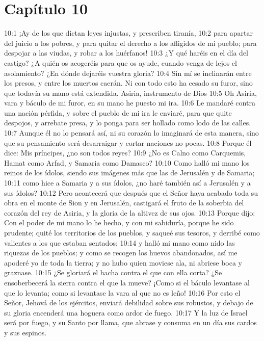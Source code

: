 \section*{Capítulo 10 }
 
10:1 ¡Ay de los que dictan leyes injustas, y prescriben tiranía, 
10:2 para apartar del juicio a los pobres, y para quitar el derecho a los afligidos de mi pueblo; para despojar a las viudas, y robar a los huérfanos! 
10:3 ¿Y qué haréis en el día del castigo? ¿A quién os acogeréis para que os ayude, cuando venga de lejos el asolamiento? ¿En dónde dejaréis vuestra gloria? 
10:4 Sin mí se inclinarán entre los presos, y entre los muertos caerán. Ni con todo esto ha cesado su furor, sino que todavía su mano está extendida. 
Asiria, instrumento de Dios 
10:5 Oh Asiria, vara y báculo de mi furor, en su mano he puesto mi ira. 
10:6 Le mandaré contra una nación pérfida, y sobre el pueblo de mi ira le enviaré, para que quite despojos, y arrebate presa, y lo ponga para ser hollado como lodo de las calles. 
10:7 Aunque él no lo pensará así, ni su corazón lo imaginará de esta manera, sino que su pensamiento será desarraigar y cortar naciones no pocas. 
10:8 Porque él dice: Mis príncipes, ¿no son todos reyes? 
10:9 ¿No es Calno como Carquemis, Hamat como Arfad, y Samaria como Damasco? 
10:10 Como halló mi mano los reinos de los ídolos, siendo sus imágenes más que las de Jerusalén y de Samaria; 
10:11 como hice a Samaria y a sus ídolos, ¿no haré también así a Jerusalén y a sus ídolos? 
10:12 Pero acontecerá que después que el Señor haya acabado toda su obra en el monte de Sion y en Jerusalén, castigará el fruto de la soberbia del corazón del rey de Asiria, y la gloria de la altivez de sus ojos. 
10:13 Porque dijo: Con el poder de mi mano lo he hecho, y con mi sabiduría, porque he sido prudente; quité los territorios de los pueblos, y saqueé sus tesoros, y derribé como valientes a los que estaban sentados; 
10:14 y halló mi mano como nido las riquezas de los pueblos; y como se recogen los huevos abandonados, así me apoderé yo de toda la tierra; y no hubo quien moviese ala, ni abriese boca y graznase. 
10:15 ¿Se gloriará el hacha contra el que con ella corta? ¿Se ensoberbecerá la sierra contra el que la mueve? ¡Como si el báculo levantase al que lo levanta; como si levantase la vara al que no es leño! 
10:16 Por esto el Señor, Jehová de los ejércitos, enviará debilidad sobre sus robustos, y debajo de su gloria encenderá una hoguera como ardor de fuego. 
10:17 Y la luz de Israel será por fuego, y su Santo por llama, que abrase y consuma en un día sus cardos y sus espinos. 
